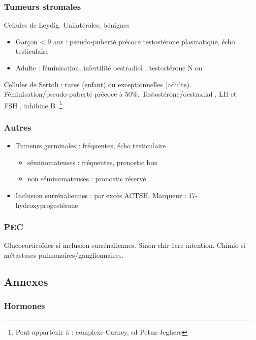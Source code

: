 \documentclass[11pt]{article}
\begin{document}
\subsubsection{Tumeurs stromales}
\label{sec:org3961478}
Cellules de Leydig. Unilatérales, bénignes
\begin{itemize}
\item Garçon < 9 ans : pseudo-puberté précoce \thus testostérone plasmatique, écho
testiculaire
\item Adulte : féminisation, infertilité \thus oestradiol \inc, testostérone N ou \dec
\end{itemize}

Cellules de Sertoli : rares (enfant) ou exceptionnelles
(adulte). Féminisation/pseudo-puberté précoce à 50\%. Testostérone/oestradial
\inc, LH et FSH \dec, inhibine B \inc.\footnote{Peut appartenir à : complexe Carney, sd Petuz-Jeghers}

\subsubsection{Autres}
\label{sec:org057a248}
\begin{itemize}
\item Tumeurs germinales : fréquentes, écho testiculaire
\begin{itemize}
\item séminomateuses : fréquentes, pronostic bon
\item non séminomateuses : pronostic réservé
\end{itemize}
\item Inclusion surrénaliennes : par excès ACTSH. Marqueur : 17-hydroxyprogestérone
\end{itemize}

\subsubsection{PEC}
\label{sec:orgc29ac4a}
Glucocorticoïdes si inclusion surrénaliennes. Sinon chir 1ere intention. Chimio si métastases pulmonaires/ganglionnaires.


\subsection{Annexes}
\label{sec:orgde28973}
\subsubsection{Hormones}
\label{sec:orgc29cd02}
\end{document}
